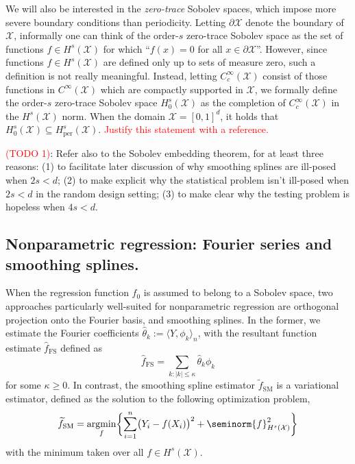 \documentclass{article}
\newcommand{\abs}[1]{\left \lvert #1 \right \rvert}
\newcommand{\1}{\mathbf{1}}
\DeclareMathOperator*{\argmin}{argmin}
\newcommand{\Xset}{\mathcal{X}}
\newcommand{\dotp}[2]{\langle #1, #2 \rangle}
\newcommand{\wt}[1]{\widetilde{#1}}
\newcommand{\wh}[1]{\widehat{#1}}
\newcommand{\SM}{\mathrm{SM}}
\newcommand{\OS}{\mathrm{FS}}
\theoremstyle{alden}
\theoremstyle{aldenthm}
\theoremstyle{definition}
\theoremstyle{remark}
\begin{document}
We will also be interested in the \emph{zero-trace} Sobolev spaces, which impose more severe boundary conditions than periodicity. Letting $\partial \Xset$ denote the boundary of $\Xset$, informally one can think of the order-$s$ zero-trace Sobolev space as the set of functions $f \in H^s(\Xset)$ for which ``$f(x) = 0$ for all $x \in \partial\Xset$''. However, since functions $f \in H^s(\Xset)$ are defined only up to sets of measure zero, such a definition is not really meaningful. Instead, letting $C_c^{\infty}(\Xset)$ consist of those functions in $C^{\infty}(\Xset)$ which are compactly supported in $\Xset$, we formally define the order-$s$ zero-trace Sobolev space $H_0^{s}(\Xset)$ as the completion of $C_c^{\infty}(\Xset)$ in the $H^{s}(\Xset)$ norm. When the domain $\Xset = [0,1]^d$, it holds that $H_0^{s}(\Xset) \subseteq H_{\textrm{per}}^{s}(\Xset)$. \textcolor{red}{Justify this statement with a reference.}

\textcolor{red}{(TODO 1)}: Refer also to the Sobolev embedding theorem, for at least three reasons: (1) to facilitate later discussion of why smoothing splines are ill-posed when $2s < d$; (2) to make explicit why the statistical problem isn't ill-posed when $2s < d$ in the random design setting; (3) to make clear why the testing problem is hopeless when $4s < d$.

\subsection{Nonparametric regression: Fourier series and smoothing splines.}
\label{subsec:continuum_methods}
When the regression function $f_0$ is assumed to belong to a Sobolev space, two approaches particularly well-suited for nonparametric regression are orthogonal projection onto the Fourier basis, and smoothing splines. In the former, we estimate the Fourier coefficients $\wh{\theta}_k := \dotp{Y}{\phi_k}_n$, with the resultant function estimate $\wh{f}_{\OS}$ defined as
\begin{equation}
\label{eqn:orthogonal_series}
\wh{f}_{\OS} = \sum_{k: \abs{k} \leq \kappa} \wh{\theta}_k \phi_k
\end{equation}
for some $\kappa \geq 0$. In contrast, the smoothing spline estimator $\wt{f}_{\SM}$ is a variational estimator, defined as the solution to the following optimization problem,
\begin{equation}
\label{eqn:smoothing_spline}
\wt{f}_{\SM} = \argmin_{f} \biggl\{\sum_{i = 1}^{n} \bigl(Y_i - f(X_i)\bigr)^2 + \seminorm{f}_{H^{s}(\Xset)}^2\biggr\}
\end{equation}
with the minimum taken over all $f \in H^s(\Xset)$.
\end{document}
